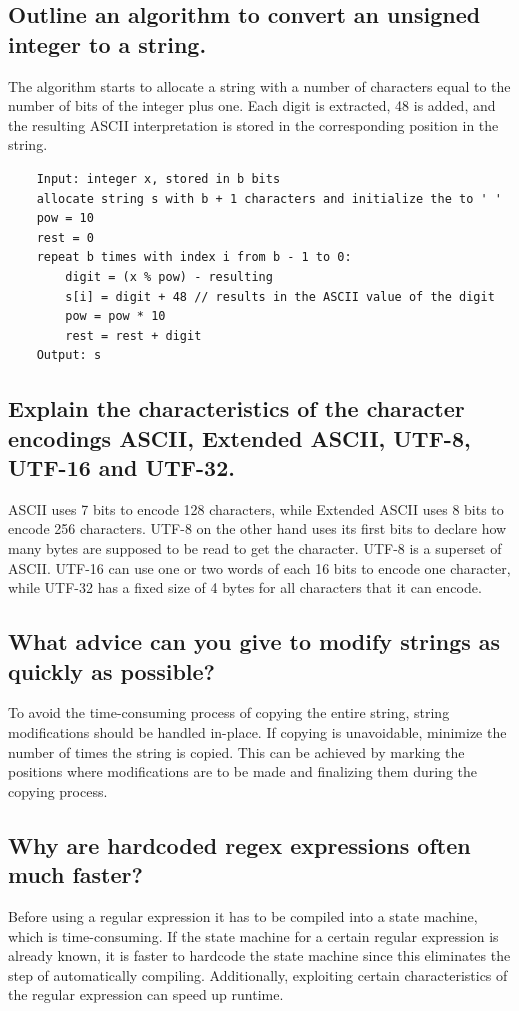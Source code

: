 \documentclass[runningheads]{llncs}
\begin{document}
\subsection*{Outline an algorithm to convert an unsigned integer to a string.}
The algorithm starts to allocate a string with a number of characters equal to the number of bits of the integer plus one.
Each digit is extracted, 48 is added, and the resulting ASCII interpretation is stored in the corresponding position
in the string.

\begin{verbatim}
    Input: integer x, stored in b bits
    allocate string s with b + 1 characters and initialize the to ' '
    pow = 10
    rest = 0
    repeat b times with index i from b - 1 to 0:
        digit = (x % pow) - resulting
        s[i] = digit + 48 // results in the ASCII value of the digit
        pow = pow * 10
        rest = rest + digit
    Output: s
\end{verbatim}

\subsection*{Explain the characteristics of the character encodings ASCII, Extended ASCII, UTF-8, UTF-16 and UTF-32.}
ASCII uses 7 bits to encode 128 characters, while Extended ASCII uses 8 bits to encode 256 characters. UTF-8 on the
other hand uses its first bits to declare how many bytes are supposed to be read to get the character. UTF-8 is a
superset of ASCII. UTF-16 can use one or two words of each 16 bits to encode one character, while UTF-32 has a fixed size
of 4 bytes for all characters that it can encode.

\subsection*{What advice can you give to modify strings as quickly as possible?}
To avoid the time-consuming process of copying the entire string, string modifications should be handled in-place.
If copying is unavoidable, minimize the number of times the string is copied. This can be
achieved by marking the positions where modifications are to be made and finalizing them during the copying process.

\subsection*{Why are hardcoded regex expressions often much faster?}
Before using a regular expression it has to be compiled into a state machine, which is time-consuming.
If the state machine for a certain regular expression is already known, it is faster to hardcode the
state machine since this eliminates the step of automatically compiling. Additionally, exploiting
certain characteristics of the regular expression can speed up runtime.
\end{document}
